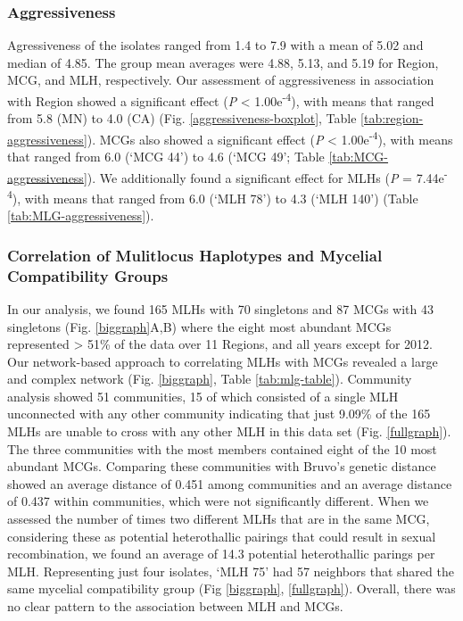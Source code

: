 \documentclass[fleqn,10pt,lineno]{wlpeerj} %
\theoremstyle{definition}
\theoremstyle{definition}
\theoremstyle{definition}
\theoremstyle{remark}
\begin{document}
\subsubsection*{Aggressiveness}\label{aggressiveness-1}

Agressiveness of the isolates ranged from 1.4 to 7.9 with a mean of 5.02
and median of 4.85. The group mean averages were 4.88, 5.13, and 5.19
for Region, MCG, and MLH, respectively. Our assessment of aggressiveness
in association with Region showed a significant effect (\emph{P}
\textless{} 1.00e\textsuperscript{-4}), with means that ranged from 5.8
(MN) to 4.0 (CA) (Fig. \ref{aggressiveness-boxplot}, Table
\ref{tab:region-aggressiveness}). MCGs also showed a significant effect
(\emph{P} \textless{} 1.00e\textsuperscript{-4}), with means that ranged
from 6.0 (`MCG 44') to 4.6 (`MCG 49'; Table
\ref{tab:MCG-aggressiveness}). We additionally found a significant
effect for MLHs (\emph{P} = 7.44e\textsuperscript{-4}), with means that
ranged from 6.0 (`MLH 78') to 4.3 (`MLH 140') (Table
\ref{tab:MLG-aggressiveness}).

\subsubsection*{Correlation of Mulitlocus Haplotypes and Mycelial
Compatibility
Groups}\label{correlation-of-mulitlocus-haplotypes-and-mycelial-compatibility-groups}

In our analysis, we found 165 MLHs with 70 singletons and 87 MCGs with
43 singletons (Fig. \ref{biggraph}A,B) where the eight most abundant
MCGs represented \textgreater{} 51\% of the data over 11 Regions, and
all years except for 2012. Our network-based approach to correlating
MLHs with MCGs revealed a large and complex network (Fig.
\ref{biggraph}, Table \ref{tab:mlg-table}). Community analysis showed 51
communities, 15 of which consisted of a single MLH unconnected with any
other community indicating that just 9.09\% of the 165 MLHs are unable
to cross with any other MLH in this data set (Fig. \ref{fullgraph}). The
three communities with the most members contained eight of the 10 most
abundant MCGs. Comparing these communities with Bruvo's genetic distance
showed an average distance of 0.451 among communities and an average
distance of 0.437 within communities, which were not significantly
different. When we assessed the number of times two different MLHs that
are in the same MCG, considering these as potential heterothallic
pairings that could result in sexual recombination, we found an average
of 14.3 potential heterothallic parings per MLH. Representing just four
isolates, `MLH 75' had 57 neighbors that shared the same mycelial
compatibility group (Fig \ref{biggraph}, \ref{fullgraph}). Overall,
there was no clear pattern to the association between MLH and MCGs.
\end{document}
